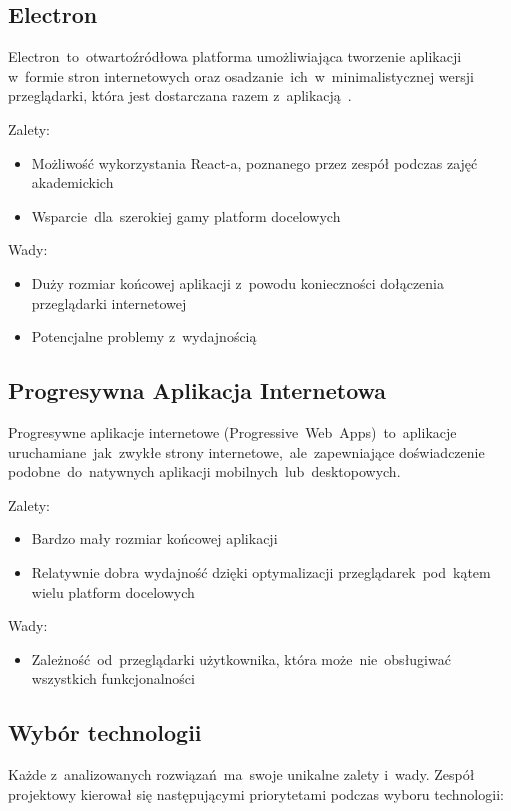 \subsection{Electron}\label{subsec:electron}
Electron~to~otwartoźródłowa platforma umożliwiająca tworzenie aplikacji w~formie stron internetowych oraz osadzanie~ich~w~minimalistycznej wersji przeglądarki, która jest dostarczana razem z~aplikacją~\cite{electron-in-action}.

Zalety:
\begin{itemize}
    \item Możliwość wykorzystania React-a, poznanego przez zespół podczas zajęć akademickich
    \item Wsparcie~dla~szerokiej gamy platform docelowych
\end{itemize}

Wady:
\begin{itemize}
    \item Duży rozmiar końcowej aplikacji z~powodu konieczności dołączenia przeglądarki internetowej
    \item Potencjalne problemy z~wydajnością
\end{itemize}

\subsection{Progresywna Aplikacja Internetowa}\label{subsec:progresywna-aplikacja-internetowa}
Progresywne aplikacje internetowe (Progressive~Web~Apps)~to~aplikacje uruchamiane~jak~zwykłe strony internetowe,~ale~zapewniające doświadczenie podobne~do~natywnych aplikacji mobilnych~lub~desktopowych.\cite{pwa-book}

Zalety:
\begin{itemize}
    \item Bardzo mały rozmiar końcowej aplikacji
    \item Relatywnie dobra wydajność dzięki optymalizacji przeglądarek~pod~kątem wielu platform docelowych
\end{itemize}

Wady:
\begin{itemize}
    \item Zależność~od~przeglądarki użytkownika, która może~nie~obsługiwać wszystkich funkcjonalności
\end{itemize}

\subsection{Wybór technologii}\label{subsec:wybor-technologii}
Każde z~analizowanych rozwiązań~ma~swoje unikalne zalety i~wady.
Zespół projektowy kierował się następującymi priorytetami podczas wyboru technologii:


